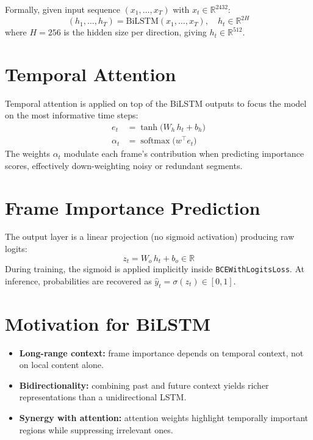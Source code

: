 \documentclass[12pt, a4paper]{report}
\begin{document}
Formally, given input sequence $(x_1, \dots, x_T)$ with $x_t \in \mathbb{R}^{2432}$:
\begin{equation}
  (h_1, \dots, h_T) = \mathrm{BiLSTM}(x_1, \dots, x_T), \quad h_t \in \mathbb{R}^{2H}
\end{equation}
where $H = 256$ is the hidden size per direction, giving $h_t \in \mathbb{R}^{512}$.

\section{Temporal Attention}

Temporal attention is applied on top of the BiLSTM outputs to focus the model on
the most informative time steps:
\begin{align}
  e_t      &= \tanh\!\bigl(W_h\, h_t + b_h\bigr) \\
  \alpha_t &= \operatorname{softmax}\!\bigl(w^{\top} e_t\bigr)
\end{align}
The weights $\alpha_t$ modulate each frame's contribution when predicting importance
scores, effectively down-weighting noisy or redundant segments.

\section{Frame Importance Prediction}

The output layer is a linear projection (no sigmoid activation) producing raw logits:
\begin{equation}
  z_t = W_o\, h_t + b_o \in \mathbb{R}
\end{equation}
During training, the sigmoid is applied implicitly inside \texttt{BCEWithLogitsLoss}.
At inference, probabilities are recovered as $\hat{y}_t = \sigma(z_t) \in [0,1]$.

\section{Motivation for BiLSTM}

\begin{itemize}[leftmargin=1.5cm]
  \item \textbf{Long-range context:} frame importance depends on temporal context,
        not on local content alone.
  \item \textbf{Bidirectionality:} combining past and future context yields richer
        representations than a unidirectional LSTM.
  \item \textbf{Synergy with attention:} attention weights highlight temporally
        important regions while suppressing irrelevant ones.
\end{itemize}
\end{document}
